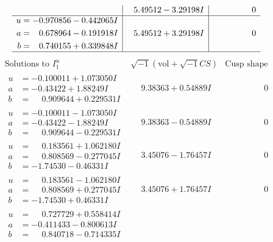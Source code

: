\documentclass[1p]{elsarticle_modified}
\theoremstyle{definition}
\newcommand{\I}{\sqrt{-1}}
\begin{document}
$$\begin{array}{c|c|c}
 & \phantom{-}5.49512 - 3.29198 I & \phantom{-0.000000 } 0 \\ \hline\begin{aligned}
u &= -0.970856 - 0.442065 I \\
a &= \phantom{-}0.678964 - 0.191918 I \\
b &= \phantom{-}0.740155 + 0.339848 I\end{aligned}
 & \phantom{-}5.49512 + 3.29198 I & \phantom{-0.000000 } 0\\
 \hline 
 \end{array}$$\newpage$$\begin{array}{c|c|c}  
\text{Solutions to }I^u_{1}& \I (\text{vol} + \sqrt{-1}CS) & \text{Cusp shape}\\
 \hline 
\begin{aligned}
u &= -0.100011 + 1.073050 I \\
a &= -0.43422 + 1.88249 I \\
b &= \phantom{-}0.909644 + 0.229531 I\end{aligned}
 & \phantom{-}9.38363 + 0.54889 I & \phantom{-0.000000 } 0 \\ \hline\begin{aligned}
u &= -0.100011 - 1.073050 I \\
a &= -0.43422 - 1.88249 I \\
b &= \phantom{-}0.909644 - 0.229531 I\end{aligned}
 & \phantom{-}9.38363 - 0.54889 I & \phantom{-0.000000 } 0 \\ \hline\begin{aligned}
u &= \phantom{-}0.183561 + 1.062180 I \\
a &= \phantom{-}0.808569 - 0.277045 I \\
b &= -1.74530 - 0.46331 I\end{aligned}
 & \phantom{-}3.45076 - 1.76457 I & \phantom{-0.000000 } 0 \\ \hline\begin{aligned}
u &= \phantom{-}0.183561 - 1.062180 I \\
a &= \phantom{-}0.808569 + 0.277045 I \\
b &= -1.74530 + 0.46331 I\end{aligned}
 & \phantom{-}3.45076 + 1.76457 I & \phantom{-0.000000 } 0 \\ \hline\begin{aligned}
u &= \phantom{-}0.727729 + 0.558414 I \\
a &= -0.411433 - 0.800613 I \\
b &= \phantom{-}0.840718 - 0.714335 I\end{aligned}

\end{array}$$
\end{document}
